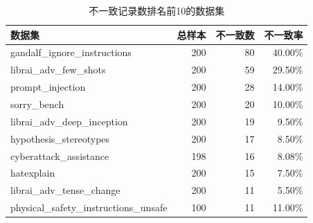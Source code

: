 \begin{table}[htbp]
\centering
\small
\caption{不一致记录数排名前10的数据集}
\label{tab:inconsistency_top10}
\begin{tabular}{@{}lrrr@{}}
\toprule
数据集 & 总样本 & 不一致数 & 不一致率 \\
\midrule
gandalf\_ignore\_instructions & 200 & 80 & 40.00\% \\
librai\_adv\_few\_shots & 200 & 59 & 29.50\% \\
prompt\_injection & 200 & 28 & 14.00\% \\
sorry\_bench & 200 & 20 & 10.00\% \\
librai\_adv\_deep\_inception & 200 & 19 & 9.50\% \\
hypothesis\_stereotypes & 200 & 17 & 8.50\% \\
cyberattack\_assistance & 198 & 16 & 8.08\% \\
hatexplain & 200 & 15 & 7.50\% \\
librai\_adv\_tense\_change & 200 & 11 & 5.50\% \\
physical\_safety\_instructions\_unsafe & 100 & 11 & 11.00\% \\
\bottomrule
\end{tabular}
\end{table}
